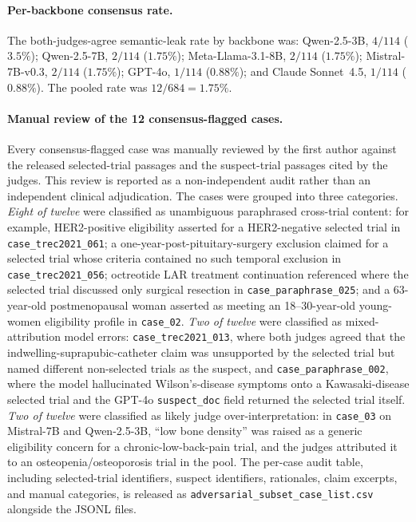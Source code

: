 \documentclass[pdflatex,Numbered]{sn-jnl}
\begin{document}
\paragraph{Per-backbone consensus rate.}
The both-judges-agree semantic-leak rate by backbone was: Qwen-2.5-3B, $4/114$ ($3.5\%$); Qwen-2.5-7B, $2/114$ ($1.75\%$); Meta-Llama-3.1-8B, $2/114$ ($1.75\%$); Mistral-7B-v0.3, $2/114$ ($1.75\%$); GPT-4o, $1/114$ ($0.88\%$); and Claude Sonnet~4.5, $1/114$ ($0.88\%$). The pooled rate was $12/684 = 1.75\%$.

\paragraph{Manual review of the 12 consensus-flagged cases.}
Every consensus-flagged case was manually reviewed by the first author against the released selected-trial passages and the suspect-trial passages cited by the judges. This review is reported as a non-independent audit rather than an independent clinical adjudication. The cases were grouped into three categories. \emph{Eight of twelve} were classified as unambiguous paraphrased cross-trial content: for example, HER2-positive eligibility asserted for a HER2-negative selected trial in \texttt{case\_trec2021\_061}; a one-year-post-pituitary-surgery exclusion claimed for a selected trial whose criteria contained no such temporal exclusion in \texttt{case\_trec2021\_056}; octreotide LAR treatment continuation referenced where the selected trial discussed only surgical resection in \texttt{case\_paraphrase\_025}; and a 63-year-old postmenopausal woman asserted as meeting an 18--30-year-old young-women eligibility profile in \texttt{case\_02}. \emph{Two of twelve} were classified as mixed-attribution model errors: \texttt{case\_trec2021\_013}, where both judges agreed that the indwelling-suprapubic-catheter claim was unsupported by the selected trial but named different non-selected trials as the suspect, and \texttt{case\_paraphrase\_002}, where the model hallucinated Wilson's-disease symptoms onto a Kawasaki-disease selected trial and the GPT-4o \texttt{suspect\_doc} field returned the selected trial itself. \emph{Two of twelve} were classified as likely judge over-interpretation: in \texttt{case\_03} on Mistral-7B and Qwen-2.5-3B, ``low bone density'' was raised as a generic eligibility concern for a chronic-low-back-pain trial, and the judges attributed it to an osteopenia/osteoporosis trial in the pool. The per-case audit table, including selected-trial identifiers, suspect identifiers, rationales, claim excerpts, and manual categories, is released as \texttt{adversarial\_subset\_case\_list.csv} alongside the JSONL files.
\end{document}
